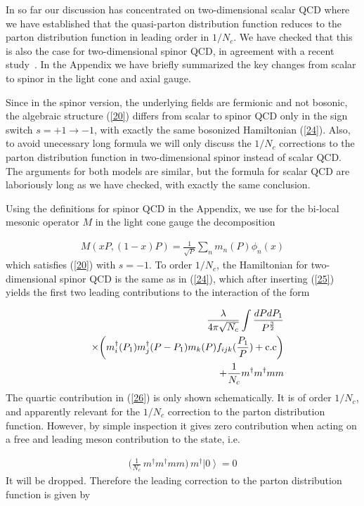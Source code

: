 \documentclass[showpacs,twocolumn,aps,preprintnumbers,letterpaper]{revtex4}
\newcommand{\be}{\begin{equation}}
\newcommand{\ee}{\end{equation}}
\def\be{\begin{eqnarray}}
\def\ee{\end{eqnarray}}
\begin{document}
In so far our discussion has concentrated on two-dimensional scalar QCD where we have established that
the quasi-parton distribution function reduces to the parton distribution function in leading order in $1/N_c$.
We have checked that this is also the case for two-dimensional spinor QCD, in agreement with a recent
study~\cite{RECENT}.
In the Appendix we have briefly summarized the key changes from scalar to spinor in the light cone and 
axial gauge. 


Since in the spinor version,  the underlying fields are fermionic and not bosonic, the algebraic structure
(\ref{20}) differs from scalar to spinor QCD  only in the sign switch $s=+1\rightarrow -1$, with exactly the same bosonized
Hamiltonian (\ref{24}). Also, 
to avoid unecessary long formula we will only discuss the $1/N_c$ corrections to the parton distribution
function in two-dimensional spinor instead of scalar QCD. The  arguments for both models are similar,
but the formula for scalar QCD  are laboriously long as we have checked, with exactly the same conclusion.



Using the definitions for spinor QCD in the
Appendix, we use for the bi-local mesonic operator $M$ in the light cone gauge the decomposition

\be
\label{25}
M(xP,(1-x)P)=\frac{1}{\sqrt{P}}\sum_{n}m_{n}(P)\phi_n(x)
\ee
which satisfies (\ref{20}) with $s=-1$.  To order $1/N_c$, the Hamiltonian for two-dimensional spinor QCD 
is the same as in (\ref{24}),  which after inserting (\ref{25}) yields the first two leading contributions to the interaction
of the form

\be
\label{26}
&&\frac{\lambda}{4\pi\sqrt{N_c}}\int \frac{dPdP_1}{P^{\frac{3}{2}}}\nonumber\\
&&\times\bigg( m_{i}^{\dagger}(P_1)m_{j}^{\dagger}(P-P_1)m_{k}(P)f_{ijk}(\frac{P_1}{P})+{\rm c.c}\bigg)\nonumber\\
&&+\frac{1}{N_c}m^{\dagger}m^{\dagger}mm  
\ee
The quartic contribution in (\ref{26}) is only shown schematically. It is of order $1/N_c$, and apparently
relevant for the $1/N_c$ correction to the parton distribution function. However, by simple inspection it
gives zero contribution when acting on a free and leading meson contribution to the state, i.e.


\be
\label{27}
\bigg( \frac 1{N_c}\,m^{\dagger}m^{\dagger}mm \bigg)\,m^\dagger \left|0\right>=0
\ee 
It will be dropped. Therefore the leading correction to the parton distribution function is given by
\end{document}
